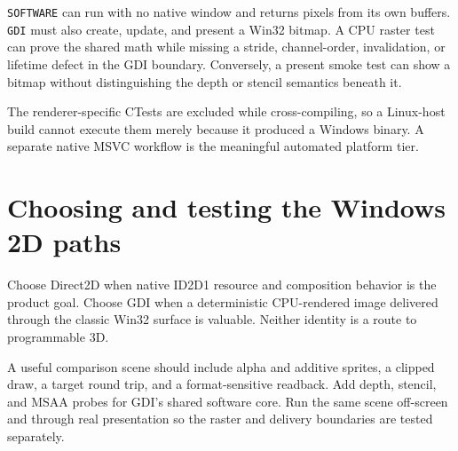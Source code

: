 \texttt{SOFTWARE} can run with no native window and returns pixels from its own buffers.
\texttt{GDI} must also create, update, and present a Win32 bitmap.  A CPU raster test can prove
the shared math while missing a stride, channel-order, invalidation, or lifetime defect in the
GDI boundary.  Conversely, a present smoke test can show a bitmap without distinguishing the
depth or stencil semantics beneath it.

The renderer-specific CTests are excluded while cross-compiling, so a Linux-host build cannot
execute them merely because it produced a Windows binary.  A separate native MSVC workflow is
the meaningful automated platform tier.

\section{Choosing and testing the Windows 2D paths}

Choose Direct2D when native ID2D1 resource and composition behavior is the product goal.
Choose GDI when a deterministic CPU-rendered image delivered through the classic Win32 surface
is valuable.  Neither identity is a route to programmable 3D.

A useful comparison scene should include alpha and additive sprites, a clipped draw, a target
round trip, and a format-sensitive readback.  Add depth, stencil, and MSAA probes for GDI's
shared software core.  Run the same scene off-screen and through real presentation so the
raster and delivery boundaries are tested separately.
